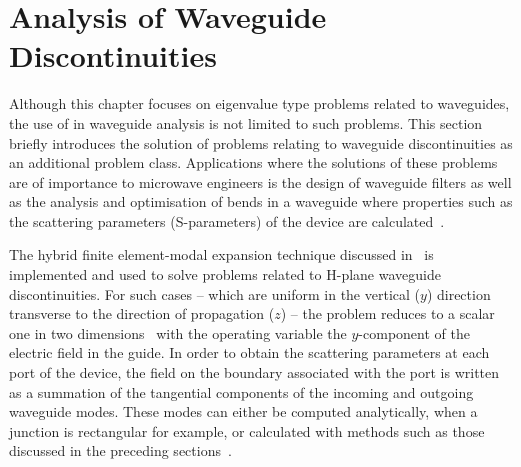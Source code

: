 \section{Analysis of Waveguide Discontinuities}
\label{lezar:sec:waveguide_discontinuities}

Although this chapter focuses on eigenvalue type problems related to
waveguides, the use of \fenics{} in waveguide analysis is not limited
to such problems. This section briefly introduces the solution of
problems relating to waveguide discontinuities as an additional
problem class. Applications where the solutions of these problems are
of importance to microwave engineers is the design of waveguide
filters as well as the analysis and optimisation of bends in a
waveguide where properties such as the scattering parameters
(S-parameters) of the device are
calculated~\cite{Pozar2005}.

The hybrid finite element-modal expansion technique discussed
in~\cite{PelosiCoccioliSelleri1998} is implemented and used to solve problems related
to H-plane waveguide discontinuities. For such cases -- which are
uniform in the vertical ($y$) direction transverse to the direction of
propagation ($z$) -- the problem reduces to a scalar one in two
dimensions~\cite{Jin2002} with the operating variable the
$y$-component of the electric field in the guide. In order to obtain
the scattering parameters at each port of the device, the field on the
boundary associated with the port is written as a summation of the
tangential components of the incoming and outgoing waveguide
modes. These modes can either be computed analytically, when a
junction is rectangular for example, or calculated with methods such
as those discussed in the preceding sections~\cite{MartiniPelosiSelleri2003}.

